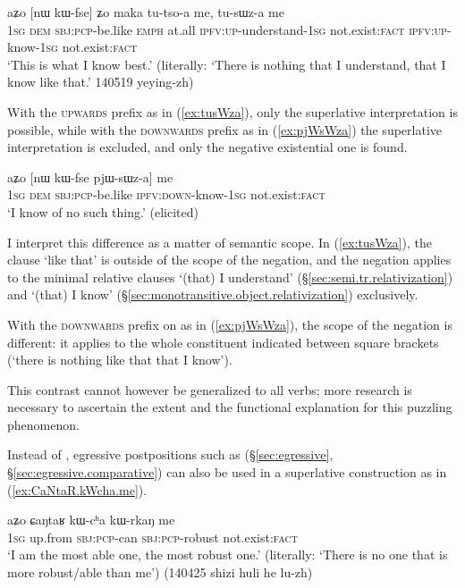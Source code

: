 \begin{exe}
\ex \label{ex:tusWza}
\gll aʑo [nɯ kɯ-fse] ʑo maka tu-tso-a me, tu-sɯz-a me \\
\textsc{1sg} \textsc{dem} \textsc{sbj}:\textsc{pcp}-be.like \textsc{emph} at.all \textsc{ipfv}:\textsc{up}-understand-\textsc{1sg} not.exist:\textsc{fact} \textsc{ipfv}:\textsc{up}-know-\textsc{1sg} not.exist:\textsc{fact} \\
\glt `This is what I know best.' (literally: `There is nothing that I understand, that I know like that.' 140519 yeying-zh)
\end{exe}

With the \textsc{upwards} prefix  as in (\ref{ex:tusWza}), only the superlative interpretation is possible, while with the \textsc{downwards} prefix  as in (\ref{ex:pjWsWza}) the superlative interpretation is excluded, and only the negative existential one is found.

\begin{exe}
\ex \label{ex:pjWsWza}
\gll aʑo [nɯ kɯ-fse pjɯ-sɯz-a] me \\
\textsc{1sg} \textsc{dem} \textsc{sbj}:\textsc{pcp}-be.like \textsc{ipfv}:\textsc{down}-know-\textsc{1sg} not.exist:\textsc{fact} \\
\glt `I know of no such thing.' (elicited)
\end{exe}

I interpret this difference as a matter of semantic scope. In (\ref{ex:tusWza}),  the clause  `like that' is outside of the scope of the negation, and the negation applies to the minimal relative clauses  `(that) I understand' (§\ref{sec:semi.tr.relativization}) and  `(that) I know' (§\ref{sec:monotransitive.object.relativization}) exclusively. 

With the \textsc{downwards} prefix  on  as in (\ref{ex:pjWsWza}), the scope of the negation is different: it applies to the whole constituent indicated between square brackets (`there is nothing like that that I know').

This contrast cannot however be generalized to all verbs; more research is necessary to ascertain the extent and the functional explanation for this puzzling phenomenon.

Instead of , egressive postpositions such as  (§\ref{sec:egressive},  §\ref{sec:egressive.comparative}) can also be used in a superlative construction as in (\ref{ex:CaNtaR.kWcha.me}).

\begin{exe}
\ex \label{ex:CaNtaR.kWcha.me}
\gll  aʑo ɕaŋtaʁ kɯ-cʰa kɯ-rkaŋ me \\
\textsc{1sg} up.from \textsc{sbj}:\textsc{pcp}-can  \textsc{sbj}:\textsc{pcp}-robust not.exist:\textsc{fact} \\
\glt `I am the most able one, the most robust one.' (literally: `There is no one that is more robust/able than me') (140425 shizi huli he lu-zh)
\end{exe}
